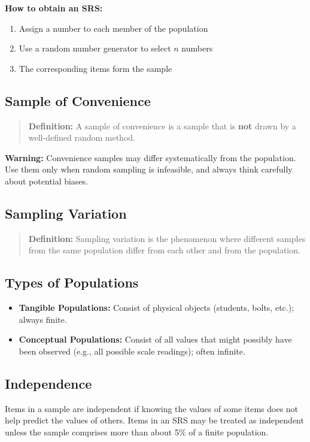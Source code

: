 \documentclass[11pt]{article}
\begin{document}
\textbf{How to obtain an SRS:}
\begin{enumerate}[nosep]
    \item Assign a number to each member of the population
    \item Use a random number generator to select \(n\) numbers
    \item The corresponding items form the sample
\end{enumerate}

\subsection*{Sample of Convenience}
\begin{quote}
\textbf{Definition:} A sample of convenience is a sample that is \textbf{not} drawn by a well-defined random method.
\end{quote}
\textbf{Warning:} Convenience samples may differ systematically from the population. Use them only when random sampling is infeasible, and always think carefully about potential biases.

\subsection*{Sampling Variation}
\begin{quote}
\textbf{Definition:} Sampling variation is the phenomenon where different samples from the same population differ from each other and from the population.
\end{quote}

\subsection*{Types of Populations}
\begin{itemize}[nosep]
    \item \textbf{Tangible Populations:} Consist of physical objects (students, bolts, etc.); always finite.
    \item \textbf{Conceptual Populations:} Consist of all values that might possibly have been observed (e.g., all possible scale readings); often infinite.
\end{itemize}

\subsection*{Independence}
Items in a sample are independent if knowing the values of some items does not help predict the values of others. Items in an SRS may be treated as independent unless the sample comprises more than about 5\% of a finite population.
\end{document}
